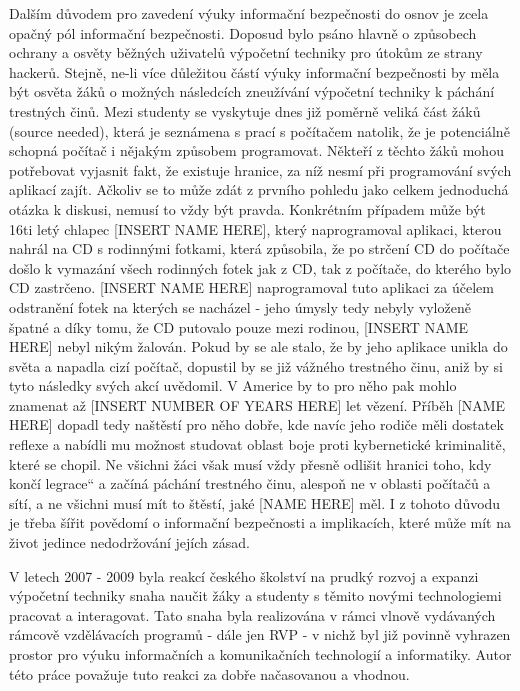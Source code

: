 \documentclass[a4paper, 11pt]{article}
\providecommand{\uv}[1]{\quotedblbase #1\textquotedblleft}
\begin{document}
Dalším důvodem pro zavedení výuky informační bezpečnosti do osnov je zcela opačný pól informační bezpečnosti. Doposud bylo psáno hlavně o způsobech ochrany a osvěty běžných uživatelů výpočetní techniky pro útokům ze strany hackerů. Stejně, ne-li více důležitou částí výuky informační bezpečnosti by měla být osvěta žáků o možných následcích zneužívání výpočetní techniky k páchání trestných činů. Mezi studenty se vyskytuje dnes již poměrně veliká část žáků (source needed), která je seznámena s prací s počítačem natolik, že je potenciálně schopná počítač i nějakým způsobem programovat. Někteří z těchto žáků mohou potřebovat vyjasnit fakt, že existuje hranice, za níž nesmí při programování svých aplikací zajít. Ačkoliv se to může zdát z prvního pohledu jako celkem jednoduchá otázka k diskusi, nemusí to vždy být pravda. Konkrétním případem může být 16ti letý chlapec [INSERT NAME HERE], který naprogramoval aplikaci, kterou nahrál na CD s rodinnými fotkami, která způsobila, že po strčení CD do počítače došlo k vymazání všech rodinných fotek jak z CD, tak z počítače, do kterého bylo CD zastrčeno. [INSERT NAME HERE] naprogramoval tuto aplikaci za účelem odstranění fotek na kterých se nacházel \-- jeho úmysly tedy nebyly vyloženě špatné a díky tomu, že CD putovalo pouze mezi rodinou, [INSERT NAME HERE] nebyl nikým žalován. Pokud by se ale stalo, že by jeho aplikace unikla do světa a napadla cizí počítač, dopustil by se již vážného trestného činu, aniž by si tyto následky svých akcí uvědomil. V Americe by to pro něho pak mohlo znamenat až [INSERT NUMBER OF YEARS HERE] let vězení. Příběh [NAME HERE] dopadl tedy naštěstí pro něho dobře, kde navíc jeho rodiče měli dostatek reflexe a nabídli mu možnost studovat oblast boje proti kybernetické kriminalitě, které se chopil. Ne všichni žáci však musí vždy přesně odlišit hranici toho, kdy končí \uv{legrace} a začíná páchání trestného činu, alespoň ne v oblasti počítačů a sítí, a ne všichni musí mít to štěstí, jaké [NAME HERE] měl. I z tohoto důvodu je třeba šířit povědomí o informační bezpečnosti a implikacích, které může mít na život jedince nedodržování jejích zásad. 

V letech 2007 \-- 2009 byla reakcí českého školství na prudký rozvoj a expanzi výpočetní techniky snaha naučit žáky a studenty s těmito novými technologiemi pracovat a interagovat. Tato snaha byla realizována v rámci vlnově vydávaných rámcově vzdělávacích programů \-- dále jen RVP \-- v nichž byl již povinně vyhrazen prostor pro výuku informačních a komunikačních technologií a informatiky. Autor této práce považuje tuto reakci za dobře načasovanou a vhodnou. %
\end{document}
